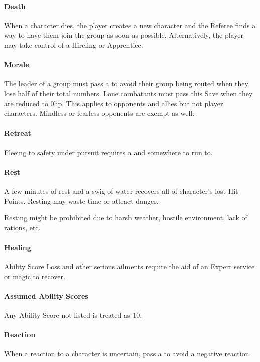 \documentclass[itdr]{subfiles}
\begin{document}
\vfill
\paragraph{Death}
When a character dies, the player creates a new character and the Referee finds a way to have them join the group as soon as possible. Alternatively, the player may take control of a Hireling or Apprentice.

\vfill
\paragraph{Morale}
The leader of a group must pass a  to avoid their group being routed when they lose half of their total numbers. Lone combatants must pass this Save when they are reduced to 0hp. This applies to opponents and allies but not player characters. Mindless or fearless opponents are exempt as well.

\vfill
\paragraph{Retreat}
Fleeing to safety under pursuit requires a  and somewhere to run to.

\vfill
\paragraph{Rest}
A few minutes of rest and a swig of water recovers all of character's lost Hit Points. Resting may waste time or attract danger.

Resting might be prohibited due to harsh weather, hostile environment, lack of rations, etc.

\vfill
\paragraph{Healing}
Ability Score Loss and other serious ailments require the aid of an Expert service or magic to recover.

\vfill
\paragraph{Assumed Ability Scores}
Any Ability Score not listed is treated as 10.

\vfill
\paragraph{Reaction}
When a reaction to a character is uncertain, pass a  to avoid a negative reaction.
\end{document}
